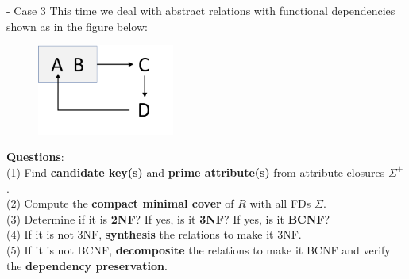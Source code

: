 \begin{frame}[fragile]{ - Case 3}
	This time we deal with abstract relations with functional dependencies shown as in the figure below:\\\vspace{-5pt}
	
	\begin{figure}
		\includegraphics[width=0.4\textwidth, trim=0 0 0 0, clip]{t5/images/case3.png}
	\end{figure}\vspace{-10pt}
	
	\textbf{Questions}:\\
	(1) Find \textbf{candidate key(s)} and \textbf{prime attribute(s)} from attribute closures $\Sigma^{+}$.\\
	(2) Compute the \textbf{compact minimal cover} of $R$ with all FDs $\Sigma$.\\
	(3) Determine if it is \textbf{2NF}? If yes, is it \textbf{3NF}? If yes, is it \textbf{BCNF}?\\
	(4) If it is not 3NF, \textbf{synthesis} the relations to make it 3NF.\\
	(5) If it is not BCNF, \textbf{decomposite} the relations to make it BCNF and verify the \textbf{dependency preservation}. 
\end{frame}

